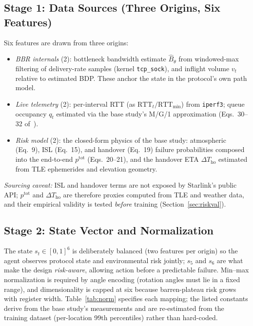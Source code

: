 \documentclass[journal]{IEEEtran}
\begin{document}
\subsection{Stage 1: Data Sources (Three Origins, Six
Features)}
\label{sec:state}
Six features are drawn from three origins:
\begin{itemize}
  \item \emph{BBR internals} (2): bottleneck bandwidth estimate
  $\hat{B}_\theta$ from windowed-max filtering of delivery-rate samples
  (kernel \texttt{tcp\_sock}), and inflight volume $v_t$ relative to
  estimated BDP. These anchor the state in the protocol's own path model.
  \item \emph{Live telemetry} (2): per-interval RTT (as
  $\mathrm{RTT}_t/\mathrm{RTT}_{\min}$) from \texttt{iperf3}; queue
  occupancy $q_t$ estimated via the base study's M/G/1 approximation
  (Eqs.~30--32 of~\cite{desilva2026tmc}).
  \item \emph{Risk model} (2): the closed-form physics of the base
  study: atmospheric (Eq.~9), ISL (Eq.~15), and handover (Eq.~19) failure
  probabilities composed into the end-to-end $p^{\mathrm{tot}}$
  (Eqs.~20--21), and the handover ETA $\Delta T_{\mathrm{ho}}$ estimated
  from TLE ephemerides and elevation geometry.
\end{itemize}
\emph{Sourcing caveat:} ISL and handover terms are not exposed by
Starlink's public API; $p^{\mathrm{tot}}$ and $\Delta T_{\mathrm{ho}}$ are
therefore proxies computed from TLE and weather data, and their empirical
validity is tested \emph{before} training (Section~\ref{sec:riskval}).

\subsection{Stage 2: State Vector and Normalization}
The state $s_t\in[0,1]^6$ is deliberately balanced (two features per
origin) so the agent observes protocol state and environmental risk
jointly; $s_5$ and $s_6$ are what make the design \emph{risk-aware},
allowing action before a predictable failure. Min--max normalization is
required by angle encoding (rotation angles must lie in a fixed range), and
dimensionality is capped at six because barren-plateau risk grows with
register width. Table~\ref{tab:norm} specifies each mapping; the listed
constants derive from the base study's measurements and are re-estimated
from the training dataset (per-location 99th percentiles) rather than
hard-coded.
\end{document}
